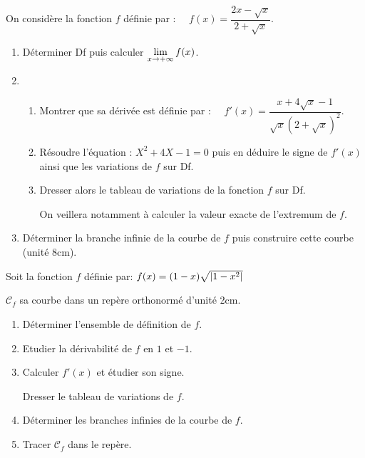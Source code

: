 \begin{exercice}

On considère la fonction $f$ définie  par :
$\quad f(x)=\dfrac{2x-\sqrt{x}}{2+\sqrt{x}}.$

\begin{enumerate}
\item Déterminer Df puis  calculer $ \displaystyle \lim_{x\to +\infty}f(x) $.
\item 
\begin{enumerate}
\item Montrer que sa dérivée est définie  par :
$\quad f'(x)=\dfrac{x+4\sqrt{x}-1}{\sqrt{x}\left(2+\sqrt{x}\right)^2}.$


\item Résoudre l'équation :
$ X^2+4X-1=0$
puis en déduire le signe de $f'(x)$ ainsi que les variations de $f$ sur Df.

\item Dresser alors le tableau de variations  de la fonction $f$ sur Df.

On veillera notamment à calculer la valeur exacte  de l'extremum de $f$.
\end{enumerate}
\item Déterminer la branche infinie de  la courbe  de $ f $ puis construire cette courbe (unité  8cm).
\end{enumerate}
\end{exercice}
\begin{exercice}
Soit la fonction $ f $ définie par:
 $ f(x)=(1-x)\sqrt{\left\lvert 1-x^2 \right\rvert} $ 

$\mathscr{C}_{f}$  sa courbe dans un repère  orthonormé d'unité 2cm.

\begin{enumerate}
\item Déterminer l'ensemble de définition de $ f $.
\item Etudier la dérivabilité de $ f $  en $ 1$ et $ -1$.
\item Calculer $ f'(x) $ et étudier son signe. 

Dresser le tableau de variations de $ f $.
\item Déterminer les branches infinies de la courbe de $ f $.
\item Tracer $\mathscr{C}_{f}$ dans le  repère.
\end{enumerate}
\end{exercice}
